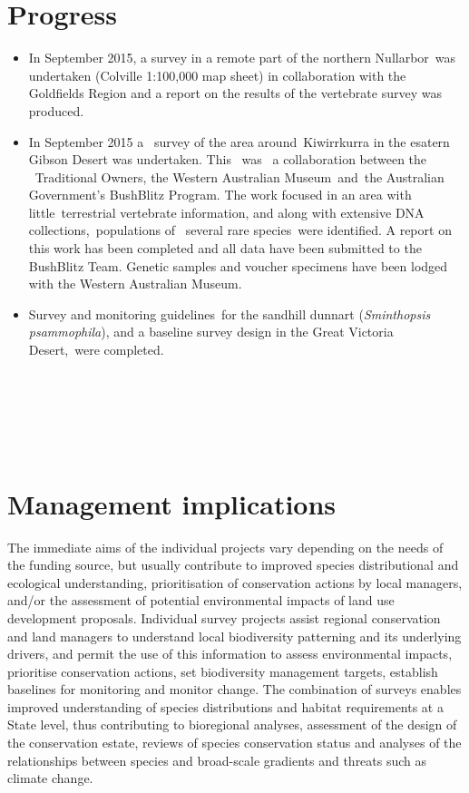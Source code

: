 \documentclass[version=last,
    paper=a4, %
    10pt, %
    usenames,
    dvipsnames,
    oneside, %
    headings=openany, %
    DIV=15 %
]{scrbook}
\begin{document}
\section*{Progress}
\begin{itemize}
\itemsep1pt\parskip0pt
\item
  In September 2015, a survey in a remote part of the northern
  Nullarbor~was undertaken (Colville 1:100,000 map sheet) in
  collaboration with the Goldfields Region and a report on the results
  of the vertebrate survey was produced.
\item
  In September 2015 a~ survey of the area around~Kiwirrkurra in the
  esatern Gibson Desert was undertaken. This ~was ~a collaboration
  between the ~Traditional Owners, the Western Australian Museum~and~the
  Australian Government's BushBlitz Program. The work focused in an area
  with little~terrestrial vertebrate information, and along with
  extensive DNA collections,~populations of ~several rare species~were
  identified. A report on this work has been completed and all data have
  been submitted to the BushBlitz Team. Genetic samples and voucher
  specimens have been lodged with the Western Australian Museum.
\item
  Survey and monitoring guidelines~for the sandhill dunnart
  (\emph{Sminthopsis psammophila}), and a baseline survey design in the
  Great Victoria Desert,~were completed.
\end{itemize}

~

~

~



\section*{Management implications}
The immediate aims of the individual projects vary depending on the
needs of the funding source, but usually contribute to improved species
distributional and ecological understanding, prioritisation of
conservation actions by local managers, and/or the assessment of
potential environmental impacts of land use development proposals.
Individual survey projects assist regional conservation and land
managers to understand local biodiversity patterning and its underlying
drivers, and permit the use of this information to assess environmental
impacts, prioritise conservation actions, set biodiversity management
targets, establish baselines for monitoring and monitor change. The
combination of surveys enables improved understanding of species
distributions and habitat requirements at a State level, thus
contributing to bioregional analyses, assessment of the design of the
conservation estate, reviews of species conservation status and analyses
of the relationships between species and broad-scale gradients and
threats such as climate change.
\end{document}
